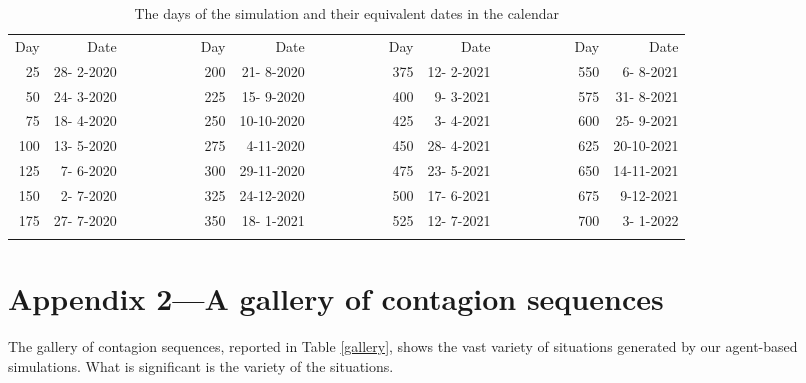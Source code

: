\documentclass[graybox]{svmult}
\begin{document}
\begin{table}[t]
\begin{center}
\begin{footnotesize}
\begin{tabular}{rrrrrrrrrrr}
\hline\noalign{\smallskip}
 Day & Date &~~~~~~~~& Day & Date &~~~~~~~~& Day & Date &~~~~~~~~& Day & Date \\
 \noalign{\smallskip}\svhline\noalign{\smallskip}
 25 & 28- 2-2020 & & 200 & 21- 8-2020 & & 375 & 12- 2-2021 & & 550 & 6- 8-2021 \\
 50 & 24- 3-2020 & & 225 & 15- 9-2020 & & 400 & 9- 3-2021 & & 575 & 31- 8-2021 \\
 75 & 18- 4-2020 & & 250 & 10-10-2020 & & 425 & 3- 4-2021 & & 600 & 25- 9-2021 \\
100 & 13- 5-2020 & & 275 & 4-11-2020 & & 450 & 28- 4-2021 & & 625 & 20-10-2021 \\
125 & 7- 6-2020 & & 300 & 29-11-2020 & & 475 & 23- 5-2021 & & 650 & 14-11-2021 \\
150 & 2- 7-2020 & & 325 & 24-12-2020 & & 500 & 17- 6-2021 & & 675 & 9-12-2021 \\
175 & 27- 7-2020 & & 350 & 18- 1-2021 & & 525 & 12- 7-2021 & & 700 & 3- 1-2022 \\
\hline\noalign{\smallskip}
\end{tabular}
\end{footnotesize}
\caption{The days of the simulation and their equivalent dates in the calendar}
\label{dates}
\end{center}
\end{table}


\section{Appendix 2---A gallery of contagion sequences}
\label{app2}

The gallery of contagion sequences, reported in Table \ref{gallery}, shows the vast variety of situations generated by our agent-based simulations. What is significant is the variety of the situations.
\end{document}
